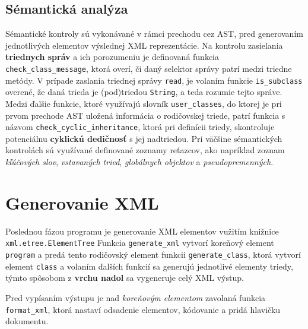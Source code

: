 \documentclass[a4paper, 11pt]{article}
\begin{document}
\subsection{Sémantická analýza}
Sémantické kontroly sú vykonávané v rámci prechodu cez \textsc{AST}, pred generovaním jednotlivých elementov výslednej \textsc{XML} reprezentácie. Na kontrolu zasielania \textbf{triednych správ} a ich porozumeniu je definovaná funkcia \texttt{check\_class\_message}, ktorá overí, či daný selektor správy patrí medzi triedne metódy. V prípade zaslania triednej správy \texttt{read}, je volaním funkcie \texttt{is\_subclass} overené, že daná trieda je (pod)triedou \texttt{String}, a teda rozumie tejto správe. Medzi ďalšie funkcie, ktoré využívajú slovník \texttt{user\_classes}, do ktorej je pri prvom prechode \textsc{AST} uložená informácia o rodičovskej triede, patrí funkcia s názvom \texttt{check\_cyclic\_inheritance}, ktorá pri definícii triedy, skontroluje potenciálnu \textbf{cyklickú dedičnosť} s jej nadtriedou. Pri väčšine sémantických kontrolách sú využívané definované zoznamy reťazcov, ako napríklad zoznam \emph{kľúčových slov}, \emph{vstavaných tried}, \emph{globálnych objektov} a \emph{pseudopremenných}. 

\section{Generovanie XML}
Poslednou fázou programu je generovanie \textsc{XML} elementov vužitím knižnice \texttt{xml.etree.ElementTree} Funkcia \texttt{generate\_xml} vytvorí koreňový element \texttt{program} a predá tento rodičovský element funkcii \texttt{generate\_class}, ktorá vytvorí element \texttt{class} a volaním ďalších funkcií sa generujú jednotlivé elementy triedy, týmto spôsobom z \textbf{vrchu nadol} sa vygeneruje celý \textsc{XML} výstup.

Pred vypísaním výstupu je nad \emph{koreňovým elementom} zavolaná funkcia \texttt{format\_xml}, ktorá nastaví odsadenie elementov, kódovanie a pridá hlavičku dokumentu.
\end{document}

